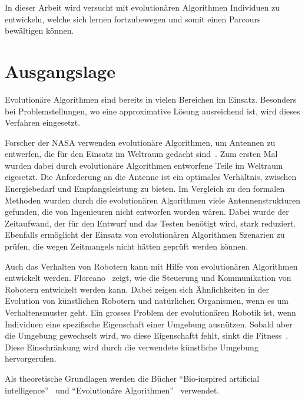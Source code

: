   In dieser Arbeit wird versucht mit evolutionären Algorithmen Individuen zu entwickeln,
  welche sich lernen fortzubewegen und somit einen Parcours bewältigen können.

  \section{Ausgangslage}

    Evolutionäre Algorithmen sind bereits in vielen Bereichen im Einsatz.
    Besonders bei Problemstellungen, wo eine approximative Lösung ausreichend ist,
    wird dieses Verfahren eingesetzt.

    \medskip

    Forscher der NASA verwenden evolutionäre Algorithmen, um Antennen zu entwerfen,
    die für den Einsatz im Weltraum gedacht sind~\cite{Hornby2006}.
    Zum ersten Mal wurden dabei durch evolutionäre Algorithmen entworfene Teile im Weltraum eigesetzt.
    Die Anforderung an die Antenne ist ein optimales Verhältnis, zwischen Energiebedarf und Empfangsleistung zu bieten.
    Im Vergleich zu den formalen Methoden wurden durch die evolutionären Algorithmen viele Antennenstrukturen gefunden,
    die von Ingenieuren nicht entworfen worden wären.
    Dabei wurde der Zeitaufwand, der für den Entwurf und das Testen benötigt wird, stark reduziert.
    Ebenfalls ermöglicht der Einsatz von evolutionären Algorithmen Szenarien zu prüfen,
    die wegen Zeitmangels nicht hätten geprüft werden können.

    \medskip

    Auch das Verhalten von Robotern kann mit Hilfe von evolutionären Algorithmen entwickelt werden.
    Floreano~\cite{Floreano2010} zeigt, wie die Steuerung und Kommunikation von Robotern entwickelt werden kann.
    Dabei zeigen sich Ähnlichkeiten in der Evolution von künstlichen Robotern und natürlichen Organismen,
    wenn es um Verhaltensmuster geht.
    Ein grosses Problem der evolutionären Robotik ist,
    wenn Individuen eine spezifische Eigenschaft einer Umgebung ausnützen.
    Sobald aber die Umgebung gewechselt wird, wo diese Eigenschaftt fehlt, sinkt die Fitness~\cite[S.6]{Floreano2010}.
    Diese Einschränkung wird durch die verwendete künstliche Umgebung hervorgerufen.

    \medskip

    Als theoretische Grundlagen werden die Bücher ``Bio-inspired artificial intelligence''~\cite{book:bioInspired} und
    ``Evolutionäre Algorithmen''~\cite{book:evAlgo} verwendet.

